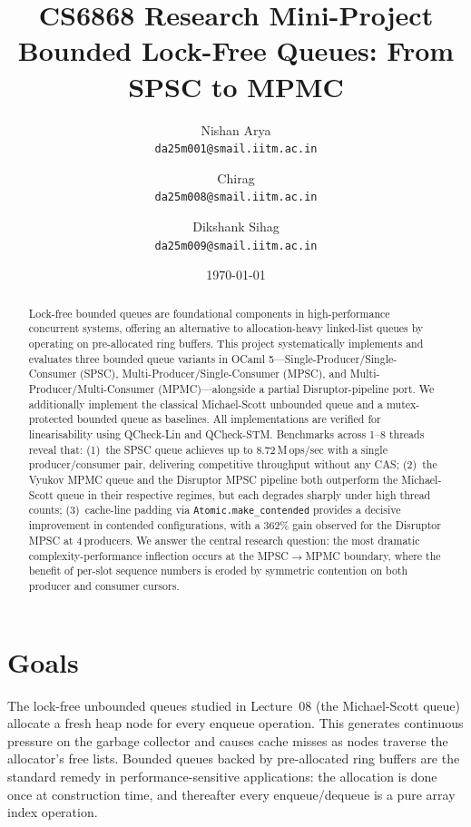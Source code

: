 \documentclass[11pt,a4paper]{article}
\title{%
  \textbf{CS6868 Research Mini-Project} \\[0.3em]
  \Large Bounded Lock-Free Queues: From SPSC to MPMC%
}
\author{%
  Nishan Arya \\ \texttt{da25m001@smail.iitm.ac.in}
  \and
  Chirag \\ \texttt{da25m008@smail.iitm.ac.in}
  \and
  Dikshank Sihag \\ \texttt{da25m009@smail.iitm.ac.in}
}
\date{\today}
\begin{document}
\maketitle

\begin{abstract}
Lock-free bounded queues are foundational components in high-performance concurrent systems,
offering an alternative to allocation-heavy linked-list queues by operating on pre-allocated
ring buffers. This project systematically implements and evaluates three bounded queue variants
in OCaml 5---Single-Producer/Single-Consumer (SPSC), Multi-Producer/Single-Consumer (MPSC), and
Multi-Producer/Multi-Consumer (MPMC)---alongside a partial Disruptor-pipeline port.
We additionally implement the classical Michael-Scott unbounded queue and a mutex-protected
bounded queue as baselines. All implementations are verified for linearisability using
QCheck-Lin and QCheck-STM. Benchmarks across 1--8 threads reveal that: (1)~the SPSC queue
achieves up to 8.72\,M\,ops/sec with a single producer/consumer pair, delivering
competitive throughput without any CAS; (2)~the Vyukov MPMC queue and the Disruptor MPSC
pipeline both outperform the Michael-Scott queue in their respective regimes, but each
degrades sharply under high thread counts; (3)~cache-line padding via \texttt{Atomic.make\_contended}
provides a decisive improvement in contended configurations, with a 362\% gain observed
for the Disruptor MPSC at 4\,producers. We answer the central research question: the most
dramatic complexity-performance inflection occurs at the MPSC$\to$MPMC boundary, where
the benefit of per-slot sequence numbers is eroded by symmetric contention on both producer
and consumer cursors.
\end{abstract}

\section{Goals}
\label{sec:goals}

The lock-free unbounded queues studied in Lecture~08 (the Michael-Scott queue) allocate
a fresh heap node for every enqueue operation. This generates continuous pressure on the
garbage collector and causes cache misses as nodes traverse the allocator's free lists.
Bounded queues backed by pre-allocated ring buffers are the standard remedy in
performance-sensitive applications: the allocation is done once at construction time,
and thereafter every enqueue/dequeue is a pure array index operation.
\end{document}
